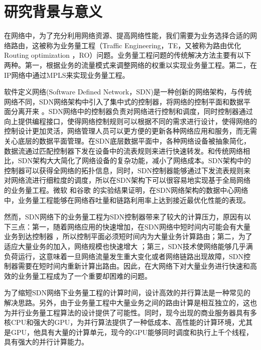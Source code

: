 \documentclass[master]{thesis-uestc}
\begin{document}
\begin{englishabstract}
\end{englishabstract}
\thesistableofcontents
\thesischapterexordium
\section{研究背景与意义}

在网络中，为了充分利用网络资源、提高网络性能，我们需要为业务选择合适的网络路由，这被称为业务量工程（Traffic Engineering，TE，又被称为路由优化 Routing optimization ，RO）问题。业务量工程问题的传统解决方法主要有以下两种。第一，根据业务的流量模式来调整网络的权重以实现业务量工程。第二，在IP网络中通过MPLS来实现业务量工程。

软件定义网络(Software Defined Network，SDN)是一种创新的网络架构，与传统网络不同，SDN网络架构中引入了集中式的控制器，将网络的控制平面和数据平面分离开来 。SDN网络中的控制器负责对网络进行控制和调度，同时控制器通过向上提供编程接口，使得网络控制规则可以根据不同的需求进行设计，使得网络的控制设计更加灵活，网络管理人员可以更方便的更新各种网络应用和服务，而无需关心底层的数据平面管理。在SDN底层数据平面中，各种网络设备被抽象简化，数据流通过匹配控制器下发在设备中的流表规则来进行快速转发。和传统网络相比，SDN架构大大简化了网络设备的复杂功能，减小了网络成本。SDN架构中的控制器可以获得全网络的拓扑信息，同时，SDN控制器能够通过下发流表规则来对网络流进行细粒度的调度，所以在SDN架构下可以很容易地实现基于全局网络的业务量工程。微软 和谷歌 的实验结果证明，在SDN网络架构的数据中心网络中，业务量工程能够在网络吞吐量和链路利用率上达到接近最优化性能的表现。

然而，SDN网络下的业务量工程为SDN控制器带来了较大的计算压力，原因有以下三点：第一，随着网络应用的快速增加，在SDN网络中短时间内可能会有大量业务到达控制器 ，所以控制平面必须短时间内为大量业务计算路由；第二，为了适应大量业务的加入，网络规模也快速增大 ；第三，SDN技术使网络能够几乎满负荷运行，这意味着一旦网络流量发生重大变化或者网络链路出现故障，SDN控制器需要在短时间内重新计算出路由。因此，在大网络下对大量业务进行快速和高效的业务量工程成为了一个重要却困难的问题。

为了缩短SDN网络下业务量工程的计算时间，设计高效的并行算法是一种常见的解决思路。另外，由于业务量工程中大量业务之间的路由计算是相互独立的，这也为并行业务量工程算法的设计提供了可能性。同时，现今出现的商业服务器具有多核CPU和强大的GPU，为并行算法提供了一种低成本、高性能的计算环境，尤其是GPU，他具有大量的计算单元，现今的GPU能够同时调度和执行上千个线程，具有强大的并行计算能力。
\end{document}
